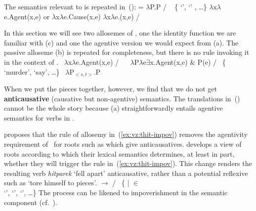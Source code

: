 \xe

The semantics relevant to {\va} is repeated in~(\nextx):
\pex {} = 
	\a $\lambda$P.P \phantom{agent(x,e)xxx} / \trace~ \{  `',  `' , \dots \}
	\a $\lambda$x$\lambda$e.Agent(x,e) or $\lambda$x$\lambda$e.Cause(x,e)
	\a $\lambda$x$\lambda$e.(x,e) / \trace~\va
\xe

In this section we will see two allosemes of {\vz}, one the identity function we are familiar with (\nextx c) and one the agentive version we would expect from {\va} (\nextx a). The passive alloseme (\nextx b) is repeated for completeness, but there is no rule invoking it in the context of {\va}.
\pex \label{ex:vz-denote}
	\a \denote{\vz} \lra~$\lambda$x$\lambda$e.Agent(x,e) / \trace~\va
	\a \denote{\vz} \lra~$\lambda$P$\lambda$e$\exists$x.Agent(x,e) \& P(e) / \trace~\{ `murder',  `say’, \dots\}
	\a \denote{\vz} \lra~$\lambda$P$_{<s,t>}$.P
\xe

When we put the pieces together, however, we find that we do not get \textbf{anticausative} (causative but non-agentive) semantics. The translations in~(\lastx) cannot be the whole story because (\lastx a) straightforwardly entails agentive semantics for verbs in {\thit}.

\cite{kastner17gjgl} proposes that the rule of allosemy in~(\ref{ex:vz:thit-impov}) removes the agentivity requirement of {\va}~for roots such as  which give anticausatives. \cite{kastner16phd,kastner17gjgl} develops a view of roots according to which their lexical semantics determines, at least in part, whether they will trigger the rule in~(\ref{ex:vz:thit-impov}). This change renders the resulting verb \emph{hitparek} `fell apart' anticausative, rather than a potential reflexive such as `tore himself to pieces'.
\ex\label{ex:vz:thit-impov}\denote{\va~\!} $\rightarrow$ {\zero} / {\vz} \trace~\{ | 
  $\in$ 
 \\ \phantom{a} \hfill 
	 `',  `',  `', \dots\}
\xe
The process can be likened to impoverishment \citep{bonet91,noyer98} in the semantic component (cf.~\citealt{nevins15roots}).

